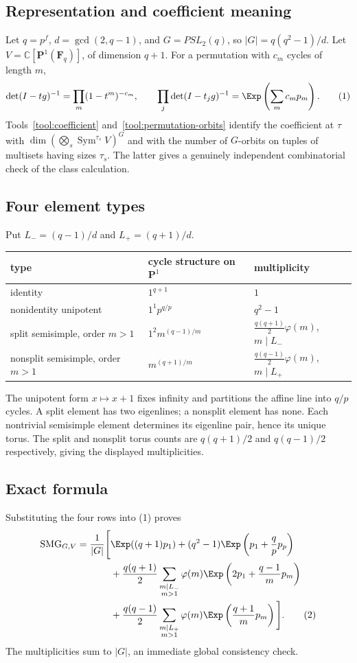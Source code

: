\documentclass[10pt]{article}
\newcommand{\Sym}{\operatorname{Sym}}
\newcommand{\SMG}{\operatorname{SMG}}
\newcommand{\MGF}{\SMG}
\begin{document}
\subsection{Representation and coefficient meaning}
Let $q=p^f$, $d=\gcd(2,q-1)$, and $G=PSL_2(q)$, so $|G|=q(q^2-1)/d$.  Let $V=\mathbb C[\mathbf P^1(\mathbf F_q)]$, of dimension $q+1$.  For a permutation with $c_m$ cycles of length $m$,
\[
 \det(I-tg)^{-1}=\prod_m(1-t^m)^{-c_m},\qquad
 \prod_j\det(I-t_jg)^{-1}=\Exp\left(\sum_m c_mp_m\right). \tag{1}
\]
Tools~\ref{tool:coefficient} and~\ref{tool:permutation-orbits} identify the
coefficient at $\tau$ with
$\dim(\bigotimes_s\Sym^{\tau_s}V)^G$ and with the number of $G$-orbits on
tuples of multisets having sizes $\tau_s$.  The latter gives a genuinely
independent combinatorial check of the class calculation.

\subsection{Four element types}
Put $L_-=(q-1)/d$ and $L_+=(q+1)/d$.
\begin{center}\begin{tabularx}{\linewidth}{@{}lXl@{}}\toprule
type & cycle structure on $\mathbf P^1$ & multiplicity\\\midrule
identity & $1^{q+1}$ & $1$\\
nonidentity unipotent & $1^1p^{q/p}$ & $q^2-1$\\
split semisimple, order $m>1$ & $1^2m^{(q-1)/m}$ & $\frac{q(q+1)}2\varphi(m)$, $m\mid L_-$\\
nonsplit semisimple, order $m>1$ & $m^{(q+1)/m}$ & $\frac{q(q-1)}2\varphi(m)$, $m\mid L_+$\\\bottomrule
\end{tabularx}\end{center}
The unipotent form $x\mapsto x+1$ fixes infinity and partitions the affine line into $q/p$ cycles.  A split element has two eigenlines; a nonsplit element has none.  Each nontrivial semisimple element determines its eigenline pair, hence its unique torus.  The split and nonsplit torus counts are $q(q+1)/2$ and $q(q-1)/2$ respectively, giving the displayed multiplicities.

\subsection{Exact formula}
Substituting the four rows into (1) proves
\begin{align}
\MGF_{G,V}=\frac1{|G|}\Bigg[&\Exp((q+1)p_1)
+(q^2-1)\Exp\left(p_1+\frac qp p_p\right)\notag\\
&+\frac{q(q+1)}2\sum_{\substack{m\mid L_-\\m>1}}\varphi(m)
 \Exp\left(2p_1+\frac{q-1}{m}p_m\right)\notag\\
&+\frac{q(q-1)}2\sum_{\substack{m\mid L_+\\m>1}}\varphi(m)
 \Exp\left(\frac{q+1}{m}p_m\right)\Bigg]. \tag{2}
\end{align}
The multiplicities sum to $|G|$, an immediate global consistency check.
\end{document}
